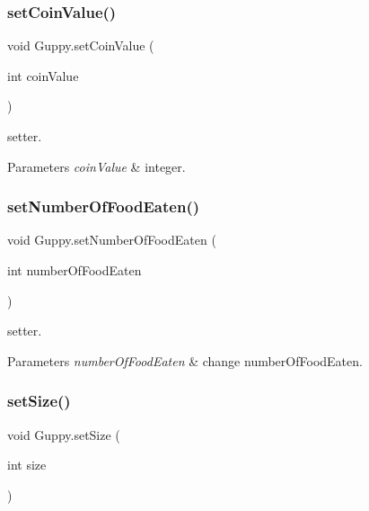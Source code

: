 \subsubsection{\texorpdfstring{set\+Coin\+Value()}{setCoinValue()}}
{\footnotesize\ttfamily void Guppy.\+set\+Coin\+Value (\begin{DoxyParamCaption}\item[{int}]{coin\+Value }\end{DoxyParamCaption})\hspace{0.3cm}{\ttfamily [inline]}}

setter. 
\begin{DoxyParams}{Parameters}
{\em coin\+Value} & integer. \\
\hline
\end{DoxyParams}
\mbox{\label{class_guppy_a90ce9ea9c330c5d8bab256a244a995e3}} 
\subsubsection{\texorpdfstring{set\+Number\+Of\+Food\+Eaten()}{setNumberOfFoodEaten()}}
{\footnotesize\ttfamily void Guppy.\+set\+Number\+Of\+Food\+Eaten (\begin{DoxyParamCaption}\item[{int}]{number\+Of\+Food\+Eaten }\end{DoxyParamCaption})\hspace{0.3cm}{\ttfamily [inline]}}

setter. 
\begin{DoxyParams}{Parameters}
{\em number\+Of\+Food\+Eaten} & change number\+Of\+Food\+Eaten. \\
\hline
\end{DoxyParams}
\mbox{\label{class_guppy_addf35bc76c2053fea12a8d0aac54d177}} 
\subsubsection{\texorpdfstring{set\+Size()}{setSize()}}
{\footnotesize\ttfamily void Guppy.\+set\+Size (\begin{DoxyParamCaption}\item[{int}]{size }\end{DoxyParamCaption})\hspace{0.3cm}{\ttfamily [inline]}}

